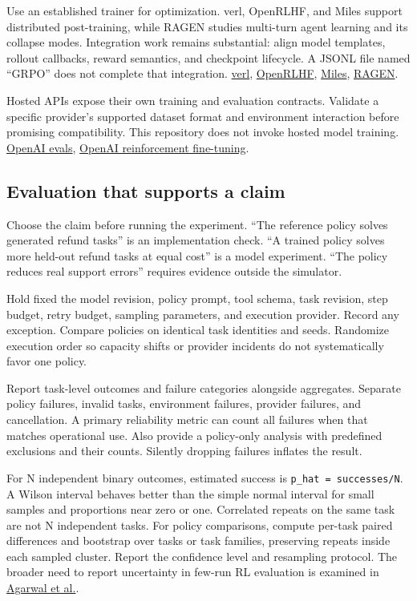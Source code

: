\documentclass[
  11pt,
  letterpaper,
]{article}
\begin{document}
Use an established trainer for optimization. verl, OpenRLHF, and Miles
support distributed post-training, while RAGEN studies multi-turn agent
learning and its collapse modes. Integration work remains substantial:
align model templates, rollout callbacks, reward semantics, and
checkpoint lifecycle. A JSONL file named ``GRPO'' does not complete that
integration. \href{https://github.com/verl-project/verl}{verl},
\href{https://github.com/OpenRLHF/OpenRLHF}{OpenRLHF},
\href{https://github.com/radixark/miles}{Miles},
\href{https://github.com/mll-lab-nu/RAGEN}{RAGEN}.

Hosted APIs expose their own training and evaluation contracts. Validate
a specific provider's supported dataset format and environment
interaction before promising compatibility. This repository does not
invoke hosted model training.
\href{https://developers.openai.com/api/docs/guides/evals}{OpenAI
evals},
\href{https://developers.openai.com/api/docs/guides/reinforcement-fine-tuning}{OpenAI
reinforcement fine-tuning}.

\subsection{Evaluation that supports a
claim}\label{evaluation-that-supports-a-claim}

Choose the claim before running the experiment. ``The reference policy
solves generated refund tasks'' is an implementation check. ``A trained
policy solves more held-out refund tasks at equal cost'' is a model
experiment. ``The policy reduces real support errors'' requires evidence
outside the simulator.

Hold fixed the model revision, policy prompt, tool schema, task
revision, step budget, retry budget, sampling parameters, and execution
provider. Record any exception. Compare policies on identical task
identities and seeds. Randomize execution order so capacity shifts or
provider incidents do not systematically favor one policy.

Report task-level outcomes and failure categories alongside aggregates.
Separate policy failures, invalid tasks, environment failures, provider
failures, and cancellation. A primary reliability metric can count all
failures when that matches operational use. Also provide a policy-only
analysis with predefined exclusions and their counts. Silently dropping
failures inflates the result.

For N independent binary outcomes, estimated success is
\texttt{p\_hat\ =\ successes/N}. A Wilson interval behaves better than
the simple normal interval for small samples and proportions near zero
or one. Correlated repeats on the same task are not N independent tasks.
For policy comparisons, compute per-task paired differences and
bootstrap over tasks or task families, preserving repeats inside each
sampled cluster. Report the confidence level and resampling protocol.
The broader need to report uncertainty in few-run RL evaluation is
examined in \href{https://arxiv.org/abs/2108.13264}{Agarwal et al.}.
\end{document}
